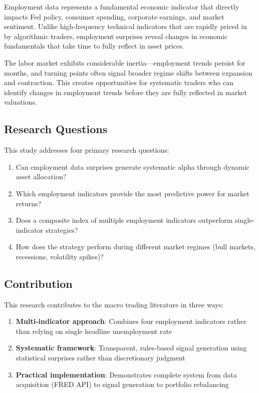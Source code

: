 \documentclass[12pt,a4paper]{article}
\begin{document}
Employment data represents a fundamental economic indicator that directly impacts Fed policy, consumer spending, corporate earnings, and market sentiment. Unlike high-frequency technical indicators that are rapidly priced in by algorithmic traders, employment surprises reveal changes in economic fundamentals that take time to fully reflect in asset prices.

The labor market exhibits considerable inertia—employment trends persist for months, and turning points often signal broader regime shifts between expansion and contraction. This creates opportunities for systematic traders who can identify changes in employment trends before they are fully reflected in market valuations.

\subsection{Research Questions}

This study addresses four primary research questions:

\begin{enumerate}
    \item Can employment data surprises generate systematic alpha through dynamic asset allocation?

    \item Which employment indicators provide the most predictive power for market returns?

    \item Does a composite index of multiple employment indicators outperform single-indicator strategies?

    \item How does the strategy perform during different market regimes (bull markets, recessions, volatility spikes)?
\end{enumerate}

\subsection{Contribution}

This research contributes to the macro trading literature in three ways:

\begin{enumerate}
    \item \textbf{Multi-indicator approach}: Combines four employment indicators rather than relying on single headline unemployment rate

    \item \textbf{Systematic framework}: Transparent, rules-based signal generation using statistical surprises rather than discretionary judgment

    \item \textbf{Practical implementation}: Demonstrates complete system from data acquisition (FRED API) to signal generation to portfolio rebalancing
\end{enumerate}
\end{document}
